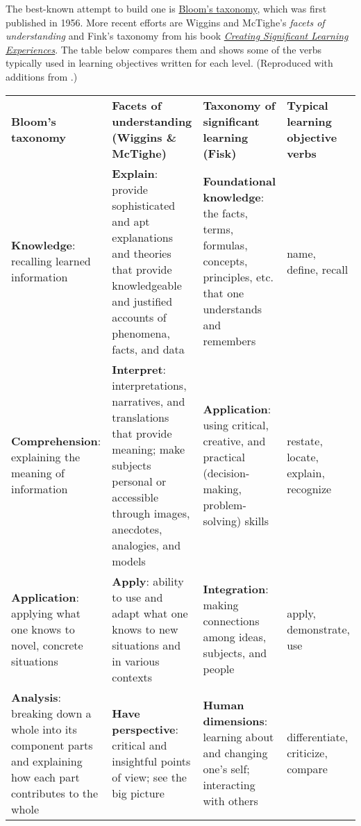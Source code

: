 The best-known attempt to build one is
\href{https://en.wikipedia.org/wiki/Bloom's\_taxonomy}{Bloom's taxonomy},
which was first published in 1956. More recent efforts are Wiggins and
McTighe's \emph{facets of understanding} and Fink's taxonomy from his
book
\emph{\href{http://www.amazon.com/Creating-Significant-Learning-Experiences-Integrated/dp/1118124251/}{Creating
Significant Learning Experiences}}. The table below compares them and
shows some of the verbs typically used in learning objectives written
for each level.
(Reproduced with additions from \cite{bib:allen-tanner}.)

\begin{tabular}{p{}p{}p{}p{}}

\textbf{Bloom's taxonomy}
&
\textbf{Facets of understanding (Wiggins \& McTighe)}
&
\textbf{Taxonomy of significant learning (Fisk)}
&
\textbf{Typical learning objective verbs}
\\

\textbf{Knowledge}: recalling learned information
&
\textbf{Explain}: provide sophisticated and apt explanations and theories that provide knowledgeable and justified accounts of phenomena, facts, and data
&
\textbf{Foundational knowledge}: the facts, terms, formulas, concepts, principles, etc. that one understands and remembers
&
name, define, recall
\\

\textbf{Comprehension}: explaining the meaning of information
&
\textbf{Interpret}: interpretations, narratives, and translations that provide meaning; make subjects personal or accessible through images, anecdotes, analogies, and models
&
\textbf{Application}: using critical, creative, and practical (decision-making, problem-solving) skills
&
restate, locate, explain, recognize
\\

\textbf{Application}: applying what one knows to novel, concrete situations
&
\textbf{Apply}: ability to use and adapt what one knows to new situations and in various contexts
&
\textbf{Integration}: making connections among ideas, subjects, and people
&
apply, demonstrate, use
\\

\textbf{Analysis}: breaking down a whole into its component parts and explaining how each part contributes to the whole
&
\textbf{Have perspective}: critical and insightful points of view; see the big picture
&
\textbf{Human dimensions}: learning about and changing one's self; interacting with others
&
differentiate, criticize, compare
\\


\end{tabular}
